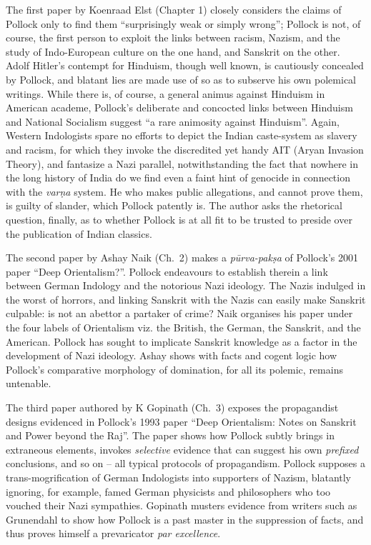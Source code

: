The first paper by Koenraad Elst (Chapter 1) closely considers the claims of Pollock only to find them “surprisingly weak or simply wrong”; Pollock is not, of course, the first person to exploit the links between racism, Nazism, and the study of Indo-European culture on the one hand, and Sanskrit on the other. Adolf Hitler’s contempt for Hinduism, though well known, is cautiously concealed by Pollock, and blatant lies are made use of so as to subserve his own polemical writings. While there is, of course, a general animus against Hinduism in American academe, Pollock’s deliberate and concocted links between Hinduism and National Socialism suggest “a rare animosity against Hinduism”.  Again, Western Indologists spare no efforts to depict the Indian caste-system as slavery and racism, for which they invoke the discredited yet handy AIT (Aryan Invasion Theory), and fantasize a Nazi parallel, notwithstanding the fact that nowhere in the long history of India do we find even a faint hint of genocide in connection with the {\sl varṇa} system. He who makes public allegations, and cannot prove them, is guilty of slander, which Pollock patently is. The author asks the rhetorical question, finally, as to whether Pollock is at all fit to be trusted to preside over the publication of Indian classics.

The second paper by Ashay Naik (Ch.~2) makes a {\sl pūrva-pakṣa} of Pollock’s 2001 paper “Deep Orientalism?”. Pollock endeavours to establish therein a link between German Indology and the notorious Nazi ideology. The Nazis indulged in the worst of horrors, and linking Sanskrit with the Nazis can easily make Sanskrit culpable: is not an abettor a partaker of crime? Naik organises his paper under the four labels of Orientalism viz. the British, the German, the Sanskrit, and the American. Pollock has sought to implicate Sanskrit knowledge as a factor in the development of Nazi ideology. Ashay shows with facts and cogent logic how Pollock’s comparative morphology of domination, for all its polemic, remains untenable.

The third paper authored by K Gopinath (Ch.~3) exposes the propagandist designs evidenced in Pollock’s 1993 paper “Deep Orientalism: Notes on Sanskrit and Power beyond the Raj”. The paper shows how Pollock subtly brings in extraneous elements, invokes {\sl selective} evidence that can suggest his own {\sl prefixed} conclusions, and so on – all typical protocols of  propagandism.  Pollock supposes a trans-mogrification of German Indologists into supporters of Nazism, blatantly ignoring, for example, famed German physicists and philosophers who too vouched their Nazi sympathies. Gopinath musters evidence from writers such as Grunendahl to show how Pollock is a past master in the suppression of facts, and thus proves himself a prevaricator {\sl par excellence}.

